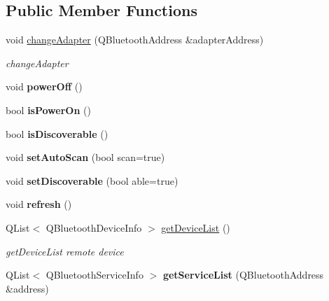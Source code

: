 \subsection*{Public Member Functions}
\begin{DoxyCompactItemize}
\item 
void \mbox{\hyperlink{class_q_qt_bluetooth_manager_a78509207159d97faa2a2ade55a441226}{change\+Adapter}} (Q\+Bluetooth\+Address \&adapter\+Address)
\begin{DoxyCompactList}\small\item\em change\+Adapter \end{DoxyCompactList}\item 
\mbox{\label{class_q_qt_bluetooth_manager_ada070a57290b386edff4798c6ee078df}} 
void {\bfseries power\+Off} ()
\item 
\mbox{\label{class_q_qt_bluetooth_manager_a4dcd5bcd795f414f0aa74b6b078a93a8}} 
bool {\bfseries is\+Power\+On} ()
\item 
\mbox{\label{class_q_qt_bluetooth_manager_a7ebeee5c557549114e60fd32ca4b2cfb}} 
bool {\bfseries is\+Discoverable} ()
\item 
\mbox{\label{class_q_qt_bluetooth_manager_a4c7b5e5e700ce06682d05374db4c24a7}} 
void {\bfseries set\+Auto\+Scan} (bool scan=true)
\item 
\mbox{\label{class_q_qt_bluetooth_manager_a9a667ea143a0528fa40275ca3d4f2e19}} 
void {\bfseries set\+Discoverable} (bool able=true)
\item 
\mbox{\label{class_q_qt_bluetooth_manager_a8f23665c09f61f15d9be3b7c6c3e55d4}} 
void {\bfseries refresh} ()
\item 
\mbox{\label{class_q_qt_bluetooth_manager_a9e0c94787309e25a666f76aea978d865}} 
Q\+List$<$ Q\+Bluetooth\+Device\+Info $>$ \mbox{\hyperlink{class_q_qt_bluetooth_manager_a9e0c94787309e25a666f76aea978d865}{get\+Device\+List}} ()
\begin{DoxyCompactList}\small\item\em get\+Device\+List remote device \end{DoxyCompactList}\item 
\mbox{\label{class_q_qt_bluetooth_manager_a4064fac52b6d92ad937fa23817c39cd8}} 
Q\+List$<$ Q\+Bluetooth\+Service\+Info $>$ {\bfseries get\+Service\+List} (Q\+Bluetooth\+Address \&address)
\end{DoxyCompactItemize}
